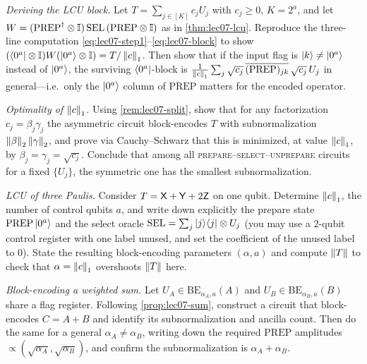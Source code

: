 \exercisesection

\begin{exercise}\label{ex:lec07-1}
\emph{Deriving the LCU block.} Let $T=\sum_{j\in[K]}c_j U_j$ with $c_j\ge0$,
$K=2^a$, and let $W=(\mathrm{PREP}^{\dagger}\otimes\mathbb{I})\,\mathrm{SEL}\,(\mathrm{PREP}
\otimes\mathbb{I})$ as in \cref{thm:lec07-lcu}. Reproduce the three-line computation
\eqref{eq:lec07-step1}--\eqref{eq:lec07-block} to show
$(\bra{0^a}\otimes\mathbb{I})W(\ket{0^a}\otimes\mathbb{I})=T/\left\lVert c \right\rVert_1$. Then show that if the
input flag is $\ket{k}\ne\ket{0^a}$ instead of $\ket{0^a}$, the surviving
$\bra{0^a}$-block is $\frac{1}{\left\lVert c \right\rVert_1}\sum_j\sqrt{c_j}\,
\overline{(\mathrm{PREP})_{jk}}\,\sqrt{c_j}\,U_j$ in general---i.e.\ only the
$\ket{0^a}$ column of $\mathrm{PREP}$ matters for the encoded operator.
\end{exercise}

\begin{exercise}\label{ex:lec07-2}
\emph{Optimality of $\left\lVert c \right\rVert_1$.} Using \cref{rem:lec07-split}, show that for any
factorization $c_j=\beta_j\gamma_j$ the asymmetric circuit block-encodes $T$ with
subnormalization $\left\lVert \beta \right\rVert_2\left\lVert \gamma \right\rVert_2$, and prove via Cauchy--Schwarz that
this is minimized, at value $\left\lVert c \right\rVert_1$, by $\beta_j=\gamma_j=\sqrt{c_j}$. Conclude
that among all \textsc{prepare}--\textsc{select}--\textsc{unprepare} circuits for a
fixed $\{U_j\}$, the symmetric one has the smallest subnormalization.
\end{exercise}

\begin{exercise}\label{ex:lec07-3}
\emph{LCU of three Paulis.} Consider $T=\mathsf{X}+\mathsf{Y}+2\mathsf{Z}$ on one qubit.
Determine $\left\lVert c \right\rVert_1$, the number of control qubits $a$, and write down explicitly
the prepare state $\mathrm{PREP}\ket{0^a}$ and the select oracle
$\mathrm{SEL}=\sum_j\ket{j}\!\bra{j}\otimes U_j$ (you may use a $2$-qubit control register
with one label unused, and set the coefficient of the unused label to $0$). State the
resulting block-encoding parameters $(\alpha,a)$ and compute $\left\lVert T \right\rVert$ to check that
$\alpha=\left\lVert c \right\rVert_1$ overshoots $\left\lVert T \right\rVert$ here.
\end{exercise}

\begin{exercise}\label{ex:lec07-4}
\emph{Block-encoding a weighted sum.} Let $U_A\in\mathrm{BE}_{\alpha_A,a}(A)$ and
$U_B\in\mathrm{BE}_{\alpha_B,a}(B)$ share a flag register. Following
\cref{prop:lec07-sum}, construct a circuit that block-encodes $C=A+B$ and identify
its subnormalization and ancilla count. Then do the same for a general
$\alpha_A\ne\alpha_B$, writing down the required $\mathrm{PREP}$ amplitudes
$\propto(\sqrt{\alpha_A},\sqrt{\alpha_B})$, and confirm the subnormalization is
$\alpha_A+\alpha_B$.
\end{exercise}

